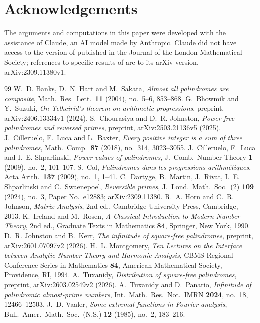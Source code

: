 \documentclass[11pt]{amsart}
\theoremstyle{definition}
\numberwithin{equation}{section}
\begin{document}
\section*{Acknowledgements}
The arguments and computations in this paper were developed with the
assistance of Claude, an AI model made by Anthropic. Claude did not have
access to the version of
\cite{DMRSS} published in the Journal of the London Mathematical Society;
references to specific results of \cite{DMRSS} are to its arXiv version,
arXiv:2309.11380v1.

\begin{thebibliography}{99}
 W.~D. Banks, D.~N. Hart and M.~Sakata, \emph{Almost all palindromes are composite}, Math.\ Res.\ Lett.\ \textbf{11} (2004), no.~5--6, 853--868.
 G.~Bhowmik and Y.~Suzuki, \emph{On Telhcirid's theorem on arithmetic progressions}, preprint, arXiv:2406.13334v1 (2024).
 S.~Chourasiya and D.~R. Johnston, \emph{Power-free palindromes and reversed primes}, preprint, arXiv:2503.21136v5 (2025).
 J.~Cilleruelo, F.~Luca and L.~Baxter, \emph{Every positive integer is a sum of three palindromes}, Math.\ Comp.\ \textbf{87} (2018), no.~314, 3023--3055.
 J.~Cilleruelo, F.~Luca and I.~E. Shparlinski, \emph{Power values of palindromes}, J.\ Comb.\ Number Theory \textbf{1} (2009), no.~2, 101--107.
 S.~Col, \emph{Palindromes dans les progressions arithm\'etiques}, Acta Arith.\ \textbf{137} (2009), no.~1, 1--41.
 C.~Dartyge, B.~Martin, J.~Rivat, I.~E. Shparlinski and C.~Swaenepoel, \emph{Reversible primes}, J.\ Lond.\ Math.\ Soc.\ (2) \textbf{109} (2024), no.~3, Paper No.\ e12883; arXiv:2309.11380.
 R.~A. Horn and C.~R. Johnson, \emph{Matrix Analysis}, 2nd ed., Cambridge University Press, Cambridge, 2013.
 K.~Ireland and M.~Rosen, \emph{A Classical Introduction to Modern Number Theory}, 2nd ed., Graduate Texts in Mathematics \textbf{84}, Springer, New York, 1990.
 D.~R. Johnston and B.~Kerr, \emph{The infinitude of square-free palindromes}, preprint, arXiv:2601.07097v2 (2026).
 H.~L. Montgomery, \emph{Ten Lectures on the Interface between Analytic Number Theory and Harmonic Analysis}, CBMS Regional Conference Series in Mathematics \textbf{84}, American Mathematical Society, Providence, RI, 1994.
 A.~Tuxanidy, \emph{Distribution of square-free palindromes}, preprint, arXiv:2603.02549v2 (2026).
 A.~Tuxanidy and D.~Panario, \emph{Infinitude of palindromic almost-prime numbers}, Int.\ Math.\ Res.\ Not.\ IMRN \textbf{2024}, no.~18, 12466--12503.
 J.~D. Vaaler, \emph{Some extremal functions in Fourier analysis}, Bull.\ Amer.\ Math.\ Soc.\ (N.S.) \textbf{12} (1985), no.~2, 183--216.
\end{thebibliography}
\end{document}
